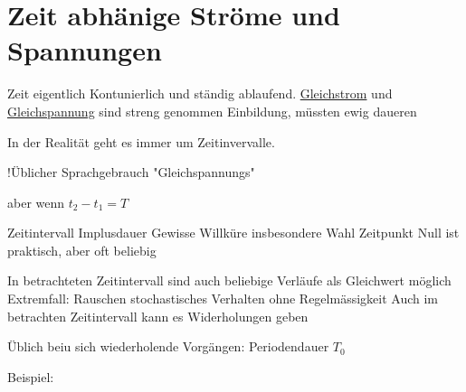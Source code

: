 \documentclass{article}
\begin{document}
\section{Zeit abhänige Ströme und Spannungen}

Zeit eigentlich Kontunierlich und ständig ablaufend.
\underline{Gleichstrom} und \underline{Gleichspannung} sind streng genommen Einbildung, müssten ewig daueren

In der Realität geht es immer um Zeitinvervalle. \newline

\newline
!Üblicher Sprachgebrauch "Gleichspannungs"

aber wenn $t_2 - t_1 = T$

Zeitintervall Implusdauer
Gewisse Willküre
insbesondere Wahl Zeitpunkt Null ist praktisch, aber oft beliebig


In betrachteten Zeitintervall sind auch beliebige Verläufe als Gleichwert möglich
Extremfall: Rauschen stochastisches Verhalten ohne Regelmässigkeit
Auch im betrachten Zeitintervall kann es Widerholungen geben

Üblich beiu sich wiederholende Vorgängen: Periodendauer $T_0$

Beispiel:
\newline

\end{document}
